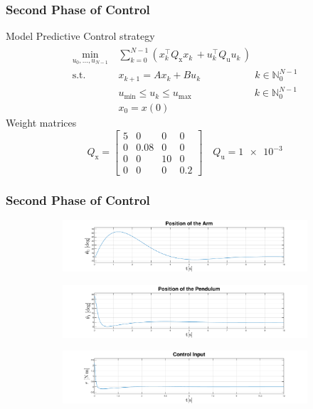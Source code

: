 \documentclass[]{beamer}
\newcommand{\lrp}[1]{\ensuremath{\left( #1 \right)}}
\newcommand{\ui}[2]{#1 _{\text{#2}}}
\begin{document}
\begin{frame}
	\frametitle{Second Phase of Control} 
	Model Predictive Control strategy
	\begin{subequations}
		\begin{align*}
			\min_{u_0,...,u_{N-1}}\ &\sum_{k=0}^{N-1} \lrp{ x_{k}^\intercal\ui{Q}{x}x_{k}^{\phantom{\intercal}}+u_{k}^\intercal\ui{Q}{u}u_{k}^{\phantom{\intercal}}}^{\phantom{\intercal}}\\
		\text{s.t.}\quad &x_{k+1} = Ax_{k} + Bu_{k}\qquad\qquad\quad \ \   k \in \mathbb{N}_0^{N-1}\\
		&\ui{u}{min}\leq u_{k}\leq \ui{u}{max}\qquad\qquad\qquad\;   k \in \mathbb{N}_0^{N-1}\\
		&x_0 = x(0)		
		\end{align*}
	\end{subequations}
Weight matrices
\begin{equation*}
\ui{Q}{x} = \begin{bmatrix}
5&0&0&0\\
0&0.08&0&0\\
0&0&10&0\\
0&0&0&0.2
\end{bmatrix} \quad \ui{Q}{u} = \num{1e-3}
\end{equation*}
\end{frame}	

\begin{frame}
	\frametitle{Second Phase of Control}
	\begin{figure}[H]
		\centering
		\begin{subfigure}
			\centering
			\includegraphics[scale=0.25]{images/MPC/arm.pdf}  
		\end{subfigure}
		\begin{subfigure}
			\centering
			\includegraphics[scale=0.25]{images/MPC/pend.pdf}  
		\end{subfigure}
		\begin{subfigure}
			\centering
			\includegraphics[scale=0.25]{images/MPC/control.pdf} 
		\end{subfigure}
	\end{figure}
\end{frame}
\end{document}
